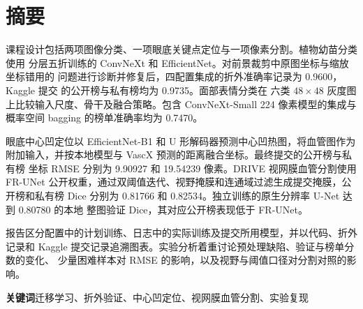 \chapter*{摘要}
课程设计包括两项图像分类、一项眼底关键点定位与一项像素分割。植物幼苗分类使用
分层五折训练的 ConvNeXt 和 EfficientNet。对前景裁剪中原图坐标与缩放坐标错用的
问题进行诊断并修复后，四配置集成的折外准确率记录为 0.9600，Kaggle 提交
 的公开榜与私有榜均为 0.9735。面部表情分类在
六类 $48\times48$ 灰度图上比较输入尺度、骨干及融合策略。包含 ConvNeXt-Small
224 像素模型的集成与概率空间 bagging 的榜单准确率均为 0.7470。

眼底中心凹定位以 EfficientNet-B1 和 U 形解码器预测中心凹热图，将血管图作为
附加输入，并按本地模型与 VascX 预测的距离融合坐标。最终提交的公开榜与私有榜
坐标 RMSE 分别为 9.90927 和 19.54239 像素。DRIVE 视网膜血管分割使用 FR-UNet
公开权重，通过双阈值迭代、视野掩膜和连通域过滤生成提交掩膜，公开榜和私有榜
Dice 分别为 0.81766 和 0.82534。独立训练的原生分辨率 U-Net 达到 0.80780 的本地
整图验证 Dice，其对应公开榜表现低于 FR-UNet。

报告区分配置中的计划训练、日志中的实际训练及提交所用模型，并以代码、折外记录和
Kaggle 提交记录追溯图表。实验分析着重讨论预处理缺陷、验证与榜单分数的变化、
少量困难样本对 RMSE 的影响，以及视野与阈值口径对分割对照的影响。

\medskip
\noindent\textbf{关键词}\quad 迁移学习、折外验证、中心凹定位、视网膜血管分割、实验复现
